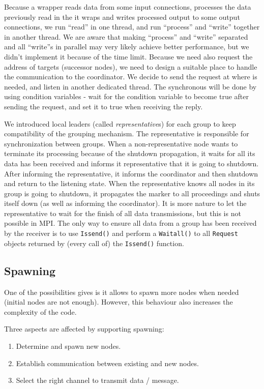 Because a wrapper reads data from some input connections, processes the data previously read in the \tPEInst it wraps and writes processed output to some output connections, we run ``read'' in one thread, and run ``process'' and ``write'' together in another thread. We are aware that making ``process'' and ``write'' separated and all ``write''s in parallel may very likely achieve better performance, but we didn't implement it because of the time limit. Because we need also request the address of targets (successor nodes), we need to design a suitable place to handle the communication to the coordinator. We decide to send the request at where is needed, and listen in another dedicated thread. The synchronous will be done by using condition variables - wait for the condition variable to become true after sending the request, and set it to true when receiving the reply.

We introduced local leaders (called \emph{representative}s) for each group to keep compatibility of the grouping mechanism. The representative is responsible for synchronization between groups. When a non-representative node wants to terminate its processing because of the shutdown propagation, it waits for all its data has been received and informs it representative that it is going to shutdown. After informing the representative, it informs the coordinator and then shutdown and return to the listening state. When the representative knows all nodes in its group is going to shutdown, it propagates the \dEOS marker to all proceedings and shuts itself down (as well as informing the coordinator). It is more nature to let the representative to wait for the finish of all data transmissions, but this is not possible in MPI. The only way to ensure all data from a group has been received by the receiver is to use \lstinline|Issend()| and perform a \lstinline|Waitall()| to all \lstinline|Request| objects returned by (every call of) the \lstinline|Issend()| function.

\subsection{Spawning}
One of the possibilities \tincdep gives \dpy is it allows to spawn more nodes when needed (\eg initial nodes are not enough). However, this behaviour also increases the complexity of the code.

Three aspects are affected by supporting spawning:
\begin{enumerate}
	\item Determine and spawn new nodes.
	\item Establish communication between existing and new nodes.
	\item Select the right channel to transmit data / message.
\end{enumerate}

